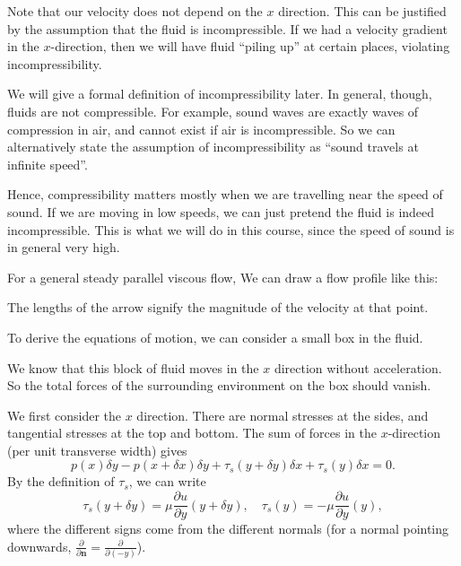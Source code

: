\documentclass[a4paper]{article}
\begin{document}
Note that our velocity does not depend on the $x$ direction. This can be justified by the assumption that the fluid is incompressible. If we had a velocity gradient in the $x$-direction, then we will have fluid ``piling up'' at certain places, violating incompressibility.

We will give a formal definition of incompressibility later. In general, though, fluids are not compressible. For example, sound waves are exactly waves of compression in air, and cannot exist if air is incompressible. So we can alternatively state the assumption of incompressibility as ``sound travels at infinite speed''.

Hence, compressibility matters mostly when we are travelling near the speed of sound. If we are moving in low speeds, we can just pretend the fluid is indeed incompressible. This is what we will do in this course, since the speed of sound is in general very high.

For a general steady parallel viscous flow, We can draw a flow profile like this:
\begin{center}
\end{center}
The lengths of the arrow signify the magnitude of the velocity at that point.

To derive the equations of motion, we can consider a small box in the fluid.
\begin{center}
\end{center}
We know that this block of fluid moves in the $x$ direction without acceleration. So the total forces of the surrounding environment on the box should vanish.

We first consider the $x$ direction. There are normal stresses at the sides, and tangential stresses at the top and bottom. The sum of forces in the $x$-direction (per unit transverse width) gives
\[
  p(x) \delta y - p(x + \delta x) \delta y + \tau_s(y + \delta y) \delta x + \tau_s(y) \delta x = 0.
\]
By the definition of $\tau_s$, we can write
\[
  \tau_s(y + \delta y) = \mu \frac{\partial u}{\partial y}(y + \delta y),\quad \tau_s (y) = -\mu \frac{\partial u}{\partial y}(y),
\]
where the different signs come from the different normals (for a normal pointing downwards, $\frac{\partial}{\partial \mathbf{n}} = \frac{\partial}{\partial(-y)}$).
\end{document}
